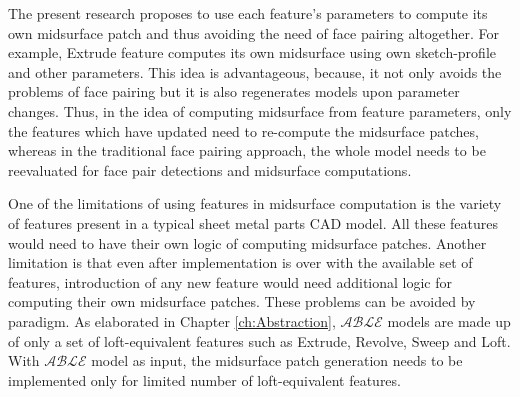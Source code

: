 %
%	
%
%
 The present research proposes to use each feature's parameters to compute its own midsurface patch and thus avoiding the need of face pairing altogether. For example, Extrude feature computes its own midsurface using own sketch-profile and other parameters. This idea is advantageous, because, it not only avoids the problems of face pairing but it is also regenerates models upon parameter changes.  Thus, in the idea of computing midsurface from feature parameters, only the features which have updated need to re-compute the midsurface patches, whereas in the traditional face pairing approach, the whole model needs to be reevaluated for face pair detections and midsurface computations.

One of the limitations of using features in midsurface computation is the variety of features present in a typical sheet metal parts CAD model. All these features would need to have their own logic of computing midsurface patches.  Another limitation is that even after implementation is over with the available set of features, introduction of any new feature would need additional logic for computing their own midsurface patches. These problems can be avoided by  paradigm. As elaborated in Chapter \ref{ch:Abstraction}, $\mathcal{ABLE}$ models are made up of only a set of loft-equivalent features such as Extrude, Revolve, Sweep and Loft. With $\mathcal{ABLE}$ model as input, the midsurface patch generation needs to be implemented only for limited number of  loft-equivalent features.

